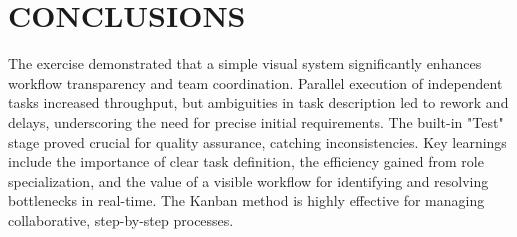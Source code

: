 \chapter{CONCLUSIONS}\label{ch:conclusion}
The exercise demonstrated that a simple visual system significantly enhances workflow transparency and team coordination. Parallel execution of independent tasks increased throughput, but ambiguities in task description led to rework and delays, underscoring the need for precise initial requirements. The built-in "Test" stage proved crucial for quality assurance, catching inconsistencies. Key learnings include the importance of clear task definition, the efficiency gained from role specialization, and the value of a visible workflow for identifying and resolving bottlenecks in real-time. The Kanban method is highly effective for managing collaborative, step-by-step processes.